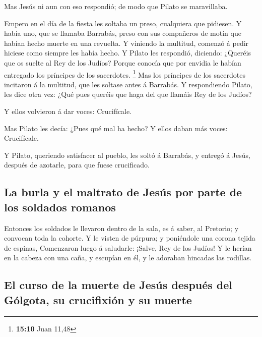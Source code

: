  Mas Jesús ni aun con eso respondió; de modo que Pilato se
maravillaba.

 Empero en el día de la fiesta les soltaba un preso,
cualquiera que pidiesen.  Y había uno, que se llamaba
Barrabás, preso con sus compañeros de motín que habían hecho muerte en
una revuelta.  Y viniendo la multitud, comenzó á pedir
hiciese como siempre les había hecho.  Y Pilato les
respondió, diciendo: ¿Queréis que os suelte al Rey de los Judíos?
 Porque conocía que por envidia le habían entregado los
príncipes de los sacerdotes. \footnote{\textbf{15:10} Juan 11,48}
 Mas los príncipes de los sacerdotes incitaron á la
multitud, que les soltase antes á Barrabás.  Y
respondiendo Pilato, les dice otra vez: ¿Qué pues queréis que haga del
que llamáis Rey de los Judíos?

 Y ellos volvieron á dar voces: Crucifícale.

 Mas Pilato les decía: ¿Pues qué mal ha hecho? Y ellos
daban más voces: Crucifícale.

 Y Pilato, queriendo satisfacer al pueblo, les soltó á
Barrabás, y entregó á Jesús, después de azotarle, para que fuese
crucificado.

\hypertarget{la-burla-y-el-maltrato-de-jesuxfas-por-parte-de-los-soldados-romanos}{%
\subsection{La burla y el maltrato de Jesús por parte de los soldados
romanos}\label{la-burla-y-el-maltrato-de-jesuxfas-por-parte-de-los-soldados-romanos}}

 Entonces los soldados le llevaron dentro de la sala, es
á saber, al Pretorio; y convocan toda la cohorte.  Y le
visten de púrpura; y poniéndole una corona tejida de espinas,
 Comenzaron luego á saludarle: ¡Salve, Rey de los Judíos!
 Y le herían en la cabeza con una caña, y escupían en él,
y le adoraban hincadas las rodillas.

\hypertarget{el-curso-de-la-muerte-de-jesuxfas-despuuxe9s-del-guxf3lgota-su-crucifixiuxf3n-y-su-muerte}{%
\subsection{El curso de la muerte de Jesús después del Gólgota, su
crucifixión y su
muerte}\label{el-curso-de-la-muerte-de-jesuxfas-despuuxe9s-del-guxf3lgota-su-crucifixiuxf3n-y-su-muerte}}

